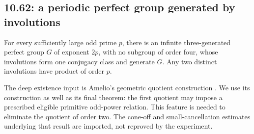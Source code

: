 \subsection{10.62: a periodic perfect group generated by involutions}
\label{cand:10.62}
\begin{proposition}
For every sufficiently large odd prime \(p\), there is an infinite
three-generated perfect group \(G\) of exponent \(2p\), with no subgroup
of order four, whose involutions form one conjugacy class and generate
\(G\). Any two distinct involutions have product of order \(p\).
\end{proposition}
The deep existence input is Amelio's geometric quotient construction
\cite[Proposition~6.1, Theorem~6.7, Remark~6.8]{amelio}.
We use its construction as well as its final theorem: the first quotient
may impose a prescribed eligible primitive odd-power relation.
This feature is needed to eliminate the quotient of order two.
The cone-off and small-cancellation estimates underlying that result
are imported, not reproved by the experiment.

